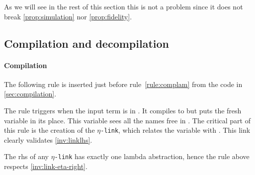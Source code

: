 \documentclass[sigconf,natbib=false,review]{acmart}
\newcommand{\appsep}{\ensuremath{\textcolor{lightgray}{\cdot}}}
\newcommand{\linkMacro}[1]{\ensuremath{#1}\texttt{-link}\xspace}
\newcommand{\linketa} {\linkMacro{\eta}}
\newcommand{\Ho}{\texorpdfstring{\ensuremath{\mathcal{H}_o}\xspace}{Ho}}
\newcommand{\rhs}{rhs\xspace}
\begin{document}
As we will see in the rest of this section this is not a problem
since it does not break
\cref{prop:simulation} nor \cref{prop:fidelity}.


% 


\subsection{Compilation and decompilation}\label{sec:etacomp}


\paragraph{Compilation}
The following rule is inserted just before rule~\ref{rule:complam} from the code in
\cref{sec:compilation}.



\noindent
The rule triggers when the input term  is in
\maybeeta. It compiles  to  but puts the fresh
variable  in its place. This variable sees all the names free in
. The critical part of this rule is the creation of the \linketa,
which relates the variable  with .
This link clearly validates \cref{inv:linklhs}.

\begin{corollary}
  The \rhs of any \linketa has exactly one lambda abstraction, hence
  the rule above respects \cref{inv:link-eta-right}.
  \label{cor:rhs-eta-onelamb}
\end{corollary}
\end{document}
